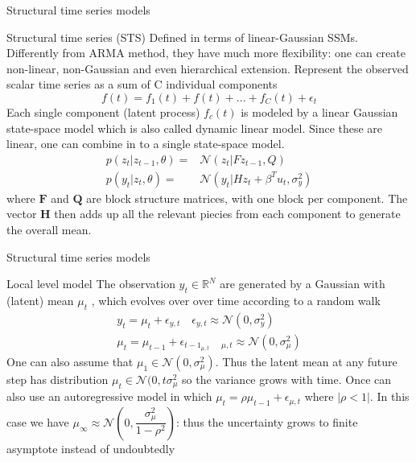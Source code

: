 \documentclass[11pt]{beamer}
\begin{document}
\begin{frame}{Structural time series models \cite{pml2Book}}
\small
\begin{alertblock}{Structural time series (STS)}
Defined in terms of linear-Gaussian SSMs. Differently from ARMA method, they have much more flexibility: one can create non-linear, non-Gaussian and even hierarchical extension.
Represent the observed scalar time series as a sum of C individual components
\begin{equation*}
f(t)=f_{1}(t)+f(t)+...+f_{C}(t)+\epsilon_{t}
\end{equation*}
Each single component (latent process) $f_{c}(t)$ is modeled by a linear Gaussian state-space model which is also called dynamic linear model. Since these are linear, one can combine in to a single state-space model. 
\begin{equation*}
\begin{split}
p(z_{t}|z_{t-1},\theta)= & \mathcal{N}(z_{t}|Fz_{t-1},Q) \\
p(y_{t}|z_{t},\theta)= & \mathcal{N}(y_{t}|Hz_{t}+\beta^{T}u_{t},\sigma^{2}_{y})
\end{split}
\end{equation*}
where $\bm{F}$ and $\bm{Q}$ are block structure matrices, with one block per component. The vector $\bm{H}$ then adds up all the relevant piecies from each component to generate the overall mean. 
\end{alertblock}
\end{frame}

\begin{frame}{Structural time series models \cite{pml2Book}}
\small
\begin{exampleblock}{Local level model}
The observation $y_{t} \in  \mathbb{R}^{N}$ are generated by a Gaussian with (latent) mean $\mu_{t}$ , which evolves over over time according to a random walk 
\begin{equation*}
\begin{split}
y_{t}=\mu_{t}+\epsilon_{y,t} \quad \epsilon_{y,t}\approx \mathcal{N}(0,\sigma_{y}^{2}) \\
\mu_{t}=\mu_{t-1}+\epsilon_{t-1}_{\mu,t} \quad_{\mu,t} \approx  \mathcal{N}(0,\sigma_{\mu}^{2})
\end{split}
\end{equation*}
One can also assume that $\mu_{1} \in  \mathcal{N}(0,\sigma^{2}_{\mu})$. Thus the latent mean at any future step has distribution $\mu_{t} \in  \mathcal{N}(0,t\sigma^{2}_{\mu}$ so the variance grows with time. Once can also use an autoregressive model in which $\mu_{t}=\rho\mu_{t-1}+\epsilon_{\mu,t}$ where $|\rho<1|$. In this case we have $\mu_{\infty}\approx \mathcal{N}(0,\dfrac{\sigma^{2}_{\mu}}{1-\rho^{2}})$: thus the uncertainty grows to finite asymptote instead of undoubtedly
\end{exampleblock}
\end{frame}
\end{document}
